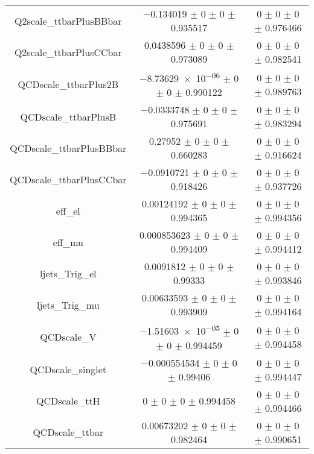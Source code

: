 \begin{table}
\begin{tabular}{ccc}
Q2scale\_ttbarPlusBBbar & \num{-0.134019} $\pm$ \num{0} $\pm$ \num{0} $\pm$ \num{0.935517} & \num{0} $\pm$ \num{0} $\pm$ \num{0} $\pm$ \num{0.976466}\\
Q2scale\_ttbarPlusCCbar & \num{0.0438596} $\pm$ \num{0} $\pm$ \num{0} $\pm$ \num{0.973089} & \num{0} $\pm$ \num{0} $\pm$ \num{0} $\pm$ \num{0.982541}\\
QCDscale\_ttbarPlus2B & \num{-8.73629e-06} $\pm$ \num{0} $\pm$ \num{0} $\pm$ \num{0.990122} & \num{0} $\pm$ \num{0} $\pm$ \num{0} $\pm$ \num{0.989763}\\
QCDscale\_ttbarPlusB & \num{-0.0333748} $\pm$ \num{0} $\pm$ \num{0} $\pm$ \num{0.975691} & \num{0} $\pm$ \num{0} $\pm$ \num{0} $\pm$ \num{0.983294}\\
QCDscale\_ttbarPlusBBbar & \num{0.27952} $\pm$ \num{0} $\pm$ \num{0} $\pm$ \num{0.660283} & \num{0} $\pm$ \num{0} $\pm$ \num{0} $\pm$ \num{0.916624}\\
QCDscale\_ttbarPlusCCbar & \num{-0.0910721} $\pm$ \num{0} $\pm$ \num{0} $\pm$ \num{0.918426} & \num{0} $\pm$ \num{0} $\pm$ \num{0} $\pm$ \num{0.937726}\\
eff\_el & \num{0.00124192} $\pm$ \num{0} $\pm$ \num{0} $\pm$ \num{0.994365} & \num{0} $\pm$ \num{0} $\pm$ \num{0} $\pm$ \num{0.994356}\\
eff\_mu & \num{0.000853623} $\pm$ \num{0} $\pm$ \num{0} $\pm$ \num{0.994409} & \num{0} $\pm$ \num{0} $\pm$ \num{0} $\pm$ \num{0.994412}\\
ljets\_Trig\_el & \num{0.0091812} $\pm$ \num{0} $\pm$ \num{0} $\pm$ \num{0.99333} & \num{0} $\pm$ \num{0} $\pm$ \num{0} $\pm$ \num{0.993846}\\
ljets\_Trig\_mu & \num{0.00633593} $\pm$ \num{0} $\pm$ \num{0} $\pm$ \num{0.993909} & \num{0} $\pm$ \num{0} $\pm$ \num{0} $\pm$ \num{0.994164}\\
QCDscale\_V & \num{-1.51603e-05} $\pm$ \num{0} $\pm$ \num{0} $\pm$ \num{0.994459} & \num{0} $\pm$ \num{0} $\pm$ \num{0} $\pm$ \num{0.994458}\\
QCDscale\_singlet & \num{-0.000554534} $\pm$ \num{0} $\pm$ \num{0} $\pm$ \num{0.99406} & \num{0} $\pm$ \num{0} $\pm$ \num{0} $\pm$ \num{0.994447}\\
QCDscale\_ttH & \num{0} $\pm$ \num{0} $\pm$ \num{0} $\pm$ \num{0.994458} & \num{0} $\pm$ \num{0} $\pm$ \num{0} $\pm$ \num{0.994466}\\
QCDscale\_ttbar & \num{0.00673202} $\pm$ \num{0} $\pm$ \num{0} $\pm$ \num{0.982464} & \num{0} $\pm$ \num{0} $\pm$ \num{0} $\pm$ \num{0.990651}\\

\end{tabular}
\end{table}
